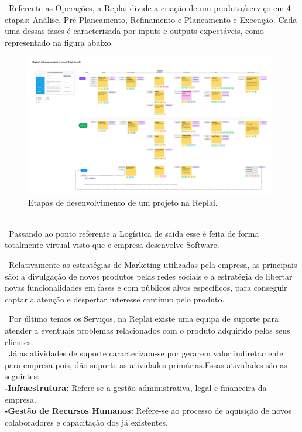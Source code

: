 \ Referente as Operações, a Replai divide a criação de um produto/serviço em 4 etapas: Análise, Pré-Planeamento, Refinamento e Planeamento e Execução. Cada uma dessas fases é caracterizada por inputs e outputs expectáveis, como representado na figura abaixo.
    \begin{figure}[ht]
       \centering
        \includegraphics[width=11cm]{images/Replai-Process.jpg}
        \caption{Etapas de desenvolvimento de um projeto na Replai.}
        \label{fig:replai_processo}
    \end{figure}\\

\ Passando ao ponto referente a Logística de saída esse é feita de forma totalmente virtual visto que e empresa desenvolve Software.

\ Relativamente as estratégias de Marketing utilizadas pela empresa, as principais são: a divulgação de novos produtos pelas redes sociais e a estratégia de libertar novas funcionalidades em fases e com públicos alvos específicos, para conseguir captar a atenção e despertar interesse continuo pelo produto.

\ Por último temos os Serviços, na Replai existe uma equipa de suporte para atender a eventuais problemas relacionados com o produto adquirido pelos seus clientes.\\

\ Já as atividades de suporte caracterizam-se por gerarem valor indiretamente para empresa pois, dão suporte as atividades primárias\cite{CadeiaDeValor}.Essas atividades são as seguintes:\\

\textbf{-Infraestrutura:} Refere-se a gestão administrativa, legal e financeira\cite{CadeiaDeValor} da empresa.\\

\textbf{-Gestão de Recursos Humanos:} Refere-se ao processo de aquisição de novos colaboradores e capacitação dos já existentes.\\

